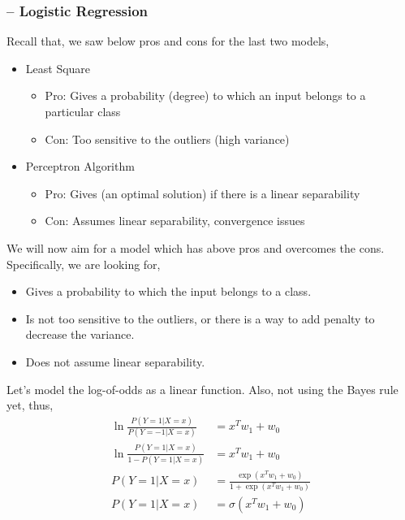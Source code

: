 \documentclass{article}
\begin{document}
\subsubsection{-- Logistic Regression}
Recall that, we saw below pros and cons for the last two models,
\begin{itemize}
    \item Least Square
        \begin{itemize}
            \item Pro: Gives a probability (degree) to which an input belongs to a particular class
            \item Con: Too sensitive to the outliers (high variance)
        \end{itemize}
    \item Perceptron Algorithm
        \begin{itemize}
            \item Pro: Gives (an optimal solution) if there is a linear separability
            \item Con: Assumes linear separability, convergence issues
        \end{itemize}
\end{itemize}

We will now aim for a model which has above pros and overcomes the cons. Specifically, we are looking for,
\begin{itemize}
    \item Gives a probability to which the input belongs to a class.
    \item Is not too sensitive to the outliers, or there is a way to add penalty to decrease the variance.
    \item Does not assume linear separability.
\end{itemize}

Let's model the log-of-odds as a linear function. Also, not using the Bayes rule yet, thus,
\begin{align*}
    \ln{\frac{P(Y=1|X=x)}{P(Y=-1|X=x)}} &= x^Tw_1+w_0\\
    \ln{\frac{P(Y=1|X=x)}{1-P(Y=1|X=x)}} &= x^Tw_1+w_0\\
    P(Y=1|X=x) &= \frac{\exp{(x^Tw_1+w_0)}}{1+\exp{(x^Tw_1+w_0)}}\\
    P(Y=1|X=x) &= \sigma(x^Tw_1+w_0)\\
\end{align*}
\end{document}
